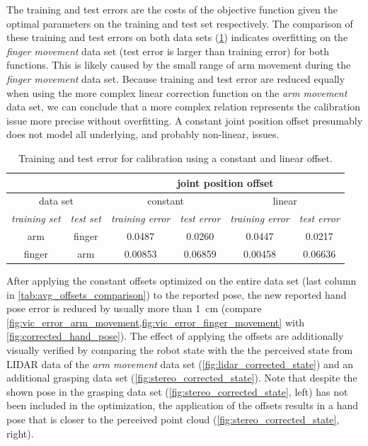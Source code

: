 The training and test errors are the costs of the objective function given the optimal parameters on the training and test set respectively. The comparison of these training and test errors on both data sets (\cref{tab:offset_training_test_error}) indicates overfitting on the \textit{finger movement} data set (test error is larger than training error) for both functions. This is likely caused by the small range of arm movement during the \textit{finger movement} data set. Because training and test error are reduced equally when using the more complex linear correction function on the \textit{arm movement} data set, we can conclude that a more complex relation represents the calibration issue more precise without overfitting. A constant joint position offset presumably does not model all underlying, and probably non-linear, issues.

\begin{table}[h]
\centering
\begin{tabular}{|c|c||c|c||c|c|}
\hline
\multicolumn{2}{|c||}{} & \multicolumn{4}{c|}{joint position offset} \\
\hline
\multicolumn{2}{|c||}{data set}  & \multicolumn{2}{c||}{constant} & \multicolumn{2}{c|}{linear} \\
\hline
\textit{training set} & \textit{test set} & \textit{training error} & \textit{test error} & \textit{training error} & \textit{test error} \\
\hline
arm & finger & 0.0487 & 0.0260 & 0.0447 & 0.0217 \\
\hline
finger & arm & 0.00853 & 0.06859 & 0.00458 & 0.06636 \\
\hline
\end{tabular}
\caption[Calibration error comparison]{Training and test error for calibration using a constant and linear offset.}
\label{tab:offset_training_test_error}
\end{table}

After applying the constant offsets optimized on the entire data set (last column in \cref{tab:avg_offsets_comparison}) to the reported pose, the new reported hand pose error is reduced by usually more than \SI{1}{\cm} (compare \cref{fig:vic_error_arm_movement,fig:vic_error_finger_movement} with \cref{fig:corrected_hand_pose}). The effect of applying the offsets are additionally visually verified by comparing the robot state with the the perceived state from LIDAR data of the \textit{arm movement} data set (\cref{fig:lidar_corrected_state}) and an additional grasping data set (\cref{fig:stereo_corrected_state}). Note that despite the shown pose in the grasping data set (\cref{fig:stereo_corrected_state}, left) has not been included in the optimization, the application of the offsets results in a hand pose that is closer to the perceived point cloud (\cref{fig:stereo_corrected_state}, right).

